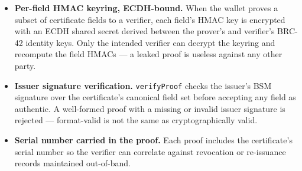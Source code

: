 \documentclass[a4paper, 11pt, openany]{book}
\begin{document}
\begin{itemize}
\item \textbf{Per-field HMAC keyring, ECDH-bound.} When the wallet proves a subset of certificate fields to a verifier, each field's HMAC key is encrypted with an ECDH shared secret derived between the prover's and verifier's BRC-42 identity keys. Only the intended verifier can decrypt the keyring and recompute the field HMACs --- a leaked proof is useless against any other party.
\item \textbf{Issuer signature verification.} \texttt{verifyProof} checks the issuer's BSM signature over the certificate's canonical field set before accepting any field as authentic. A well-formed proof with a missing or invalid issuer signature is rejected --- format-valid is not the same as cryptographically valid.
\item \textbf{Serial number carried in the proof.} Each proof includes the certificate's serial number so the verifier can correlate against revocation or re-issuance records maintained out-of-band.
\end{itemize}
\end{document}
